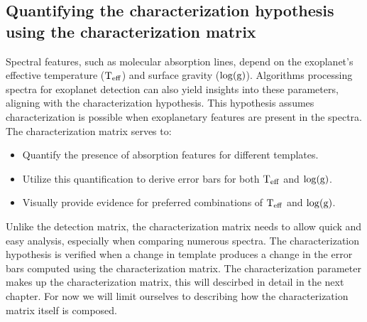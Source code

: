 \subsection{Quantifying the characterization hypothesis using the characterization matrix}
Spectral features, such as molecular absorption lines, depend on the exoplanet's effective temperature ($\rm{T_{eff}}$) and surface gravity ($\rm{\log(g)}$). Algorithms processing spectra for exoplanet detection can also yield insights into these parameters, aligning with the characterization hypothesis. This hypothesis assumes characterization is possible when exoplanetary features are present in the spectra.
The characterization matrix serves to:
\begin{itemize}
    \item Quantify the presence of absorption features for different templates.
    \item Utilize this quantification to derive error bars for both $\rm{T_{eff}}$ and $\rm{\log(g)}$. 
    \item Visually provide evidence for preferred combinations of $\rm{T_{eff}}$ and $\rm{\log(g)}$.
\end{itemize}
Unlike the detection matrix, the characterization matrix needs to allow quick and easy analysis, especially when comparing numerous spectra.
The characterization hypothesis is verified when a change in template produces a change in the error bars computed using the characterization matrix.
The characterization parameter makes up the characterization matrix, this will descirbed in detail in the next chapter. 
For now we will limit ourselves to describing how the characterization matrix itself is composed.

